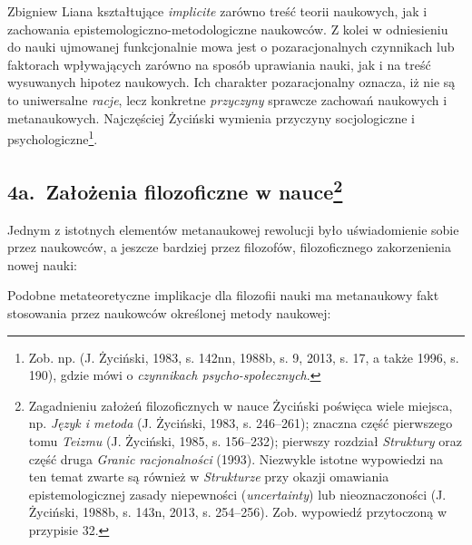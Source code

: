\begin{artplenv}{Zbigniew Liana}
kształtujące \textit{implicite} zarówno treść teorii naukowych, jak i zachowania epistemologiczno-metodologiczne
naukowców. Z kolei w odniesieniu do nauki ujmowanej funkcjonalnie mowa jest o pozaracjonalnych czynnikach lub faktorach
wpływających zarówno na sposób uprawiania nauki, jak i na treść wysuwanych hipotez naukowych. Ich charakter
pozaracjonalny oznacza, iż nie są to uniwersalne\textit{ racje}, lecz konkretne \textit{przyczyny} sprawcze zachowań
naukowych i metanaukowych. Najczęściej Życiński wymienia przyczyny socjologiczne i psychologiczne\footnote{Zob. np. 
	\label{ref:RNDijWA45P0nD}(J. Życiński, 1983, s. 142nn, 1988b, s. 9, 2013, s. 17,  a także 1996, s. 190), gdzie mówi o
	\textit{czynnikach psycho-społecznych}.}.

\subsection{4a.~Założenia filozoficzne w nauce\footnote{Zagadnieniu założeń filozoficznych w nauce Życiński poświęca wiele miejsca,
	np. \textit{Język i metoda} \label{ref:RNDXAivjQttgc}(J. Życiński, 1983, s. 246–261); znaczna część pierwszego tomu
	\textit{Teizmu} \label{ref:RND6qvog2NMv7}(J. Życiński, 1985, s. 156–232); pierwszy rozdział \textit{Struktury} oraz część
	druga \textit{Granic racjonalności} (1993). Niezwykle istotne wypowiedzi na ten temat zwarte są również w
	\textit{Strukturze} przy okazji omawiania epistemologicznej zasady niepewności (\textit{uncertainty}) lub nieoznaczoności
	\label{ref:RND7zd8YYNkba}(J. Życiński, 1988b, s. 143n, 2013, s. 254–256). Zob. wypowiedź przytoczoną w przypisie 32.}}

Jednym z istotnych elementów metanaukowej rewolucji było uświadomienie sobie przez naukowców, a jeszcze bardziej przez
filozofów, filozoficznego zakorzenienia nowej nauki:

Podobne metateoretyczne implikacje dla filozofii nauki ma metanaukowy fakt stosowania przez naukowców określonej metody
naukowej: 


\end{artplenv}
